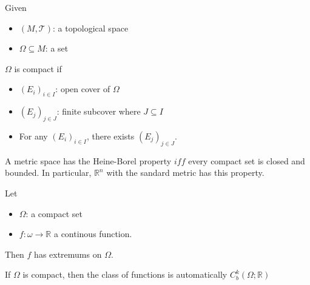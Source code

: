 \begin{definition}

    Given
    \begin{itemize}
        \item $(M,\mathcal{T})$: a topological space
        \item $\Omega \subseteq M$: a set
    \end{itemize}

    $\Omega$ is compact if
    
    \begin{itemize}
        \item $(E_i)_{i\in I}$: open cover of $\Omega$
        \item $(E_j)_{j\in J}$: finite subcover where $J \subseteq I$
        \item For any $(E_i)_{i\in I}$, there exists $(E_j)_{j\in J}$.
    \end{itemize}
\end{definition}

\begin{theorem}

    A metric space has the Heine-Borel property $iff$ every compact set is closed and bounded. In particular, $\mathbb{R}^n$ with the sandard metric has this property.
    
\end{theorem}

\begin{theorem}
    
    Let
    \begin{itemize}
        \item $\Omega$: a compact set
        \item $f:\omega\to\mathbb{R}$ a continous function.
    \end{itemize}

    Then $f$ has extremums on $\Omega$.

    \begin{remark}
        If $\Omega$ is compact, then the class of functions is automatically $C^k_b(\Omega;\mathbb{R})$
    \end{remark}

\end{theorem}

